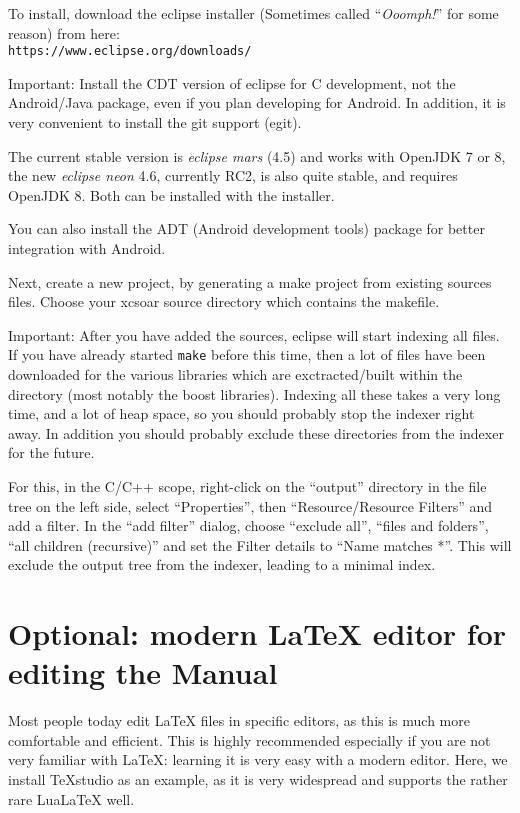 To install, download the eclipse installer (Sometimes called ``\emph{Ooomph!}'' for some reason) from here:\\
\texttt{https://www.eclipse.org/downloads/}

Important: Install the CDT version of eclipse for C development, not the Android/Java package, even if you plan developing for Android. In addition, it is very convenient to install the git support (egit).

The current stable version is \emph{eclipse mars} (4.5) and works with OpenJDK 7 or 8, the new \emph{eclipse neon} 4.6, currently RC2, is also quite stable, and requires OpenJDK 8. Both can be installed with the installer.

You can also install the ADT (Android development tools) package for better integration with Android.

Next, create a new project, by generating a make project from existing sources files. Choose your xcsoar source directory which contains the makefile.

Important: After you have added the sources, eclipse will start indexing all files. If you have already started \texttt{make} before this time, then a lot of files have been downloaded for the various libraries which are exctracted/built within the \xc directory (most notably the boost libraries). Indexing all these takes a very long time, and a lot of heap space, so you should probably stop the indexer right away. In addition you should probably exclude these directories from the indexer for the future.

For this, in the C/C++ scope, right-click on the ``output'' directory in the file tree on the left side, select ``Properties'', then ``Resource/Resource Filters'' and add a filter. In the ``add filter'' dialog, choose ``exclude all'', ``files and folders'', ``all children (recursive)'' and set the Filter details to ``Name matches *''.
This will exclude the output tree from the indexer, leading to a minimal index.

\section{Optional: modern LaTeX editor for editing the Manual}
Most people today edit LaTeX files in specific editors, as this is much more comfortable and efficient. This is highly recommended especially if you are not very familiar with LaTeX: learning it is very easy with a modern editor. Here, we install TeXstudio as an example, as it is very widespread and supports the rather rare LuaLaTeX well.


